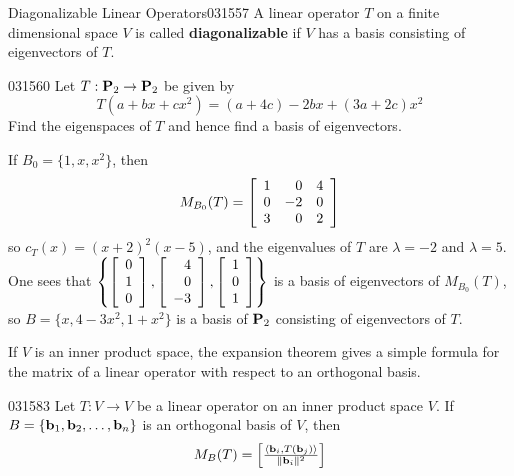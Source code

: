 \begin{definition}{Diagonalizable Linear Operators}{031557}
A linear operator $T$ on a finite dimensional space $V$ is called \textbf{diagonalizable} if $V$ has a basis consisting of eigenvectors of $T$.
\end{definition}

\begin{example}{}{031560}
Let $T : \textbf{P}_{2} \to \textbf{P}_{2}$ be given by
\begin{equation*}
T(a + bx + cx^2) = (a + 4c) - 2bx + (3a + 2c)x^2
\end{equation*}
Find the eigenspaces of $T$ and hence find a basis of eigenvectors.

\begin{solution}
If $B_{0} = \{1, x, x^{2}\}$, then
\begin{equation*}
M_{B_0}(T) = 
\left[ \begin{array}{rrr}
1 & 0 & 4 \\
0 & -2 & 0 \\
3 & 0 & 2
\end{array} \right]
\end{equation*}
so $c_{T}(x) = (x + 2)^{2}(x - 5)$, and the eigenvalues of $T$ are $\lambda = -2$ and $\lambda = 5$. One sees that 
$\left\{
\left[ \begin{array}{r}
0 \\
1 \\
0
\end{array} \right]
, 
\left[ \begin{array}{r}
4 \\
0 \\
-3
\end{array} \right]
, 
\left[ \begin{array}{r}
1 \\
0 \\
1
\end{array} \right]
\right\}$ is a basis of eigenvectors of $M_{B_{0}}(T)$, so $B = \{x, 4 - 3x^{2}, 1 + x^{2}\}$ is a basis of $\textbf{P}_{2}$ consisting of eigenvectors of $T$.
\end{solution}
\end{example}

If $V$ is an inner product space, the expansion theorem gives a simple formula for the matrix of a linear operator with respect to an orthogonal basis.

\begin{theorem}{}{031583}
Let $T : V \to V$ be a linear operator on an inner product space $V$. If $B = \{\textbf{b}_{1}, \textbf{b}_{2}, \dots, \textbf{b}_{n}\}$ is an orthogonal basis of $V$, then
\begin{equation*}
M_B(T) = 
\left[ 
\tfrac{\langle \textbf{b}_i, T(\textbf{b}_j) \rangle}{\| \textbf{b}_i \| ^2}
\right]
\end{equation*}
\end{theorem}

